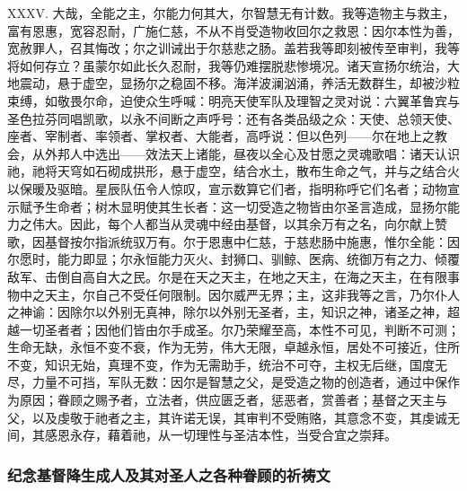 XXXV. 大哉，全能之主，尔能力何其大，尔智慧无有计数。我等造物主与救主，富有恩惠，宽容忍耐，广施仁慈，不从不肖受造物收回尔之救恩：因尔本性为善，宽赦罪人，召其悔改；尔之训诫出于尔慈悲之肠。盖若我等即刻被传至审判，我等将如何存立？虽蒙尔如此长久忍耐，我等仍难摆脱悲惨境况。诸天宣扬尔统治，大地震动，悬于虚空，显扬尔之稳固不移。海洋波澜汹涌，养活无数群生，却被沙粒束缚，如敬畏尔命，迫使众生呼喊：明亮天使军队及理智之灵对说：六翼革鲁宾与圣色拉芬同唱凯歌，以永不间断之声呼号：还有各类品级之众：天使、总领天使、座者、宰制者、率领者、掌权者、大能者，高呼说：但以色列——尔在地上之教会，从外邦人中选出——效法天上诸能，昼夜以全心及甘愿之灵魂歌唱：诸天认识祂，祂将天穹如石砌成拱形，悬于虚空，结合水土，散布生命之气，并与之结合火以保暖及驱暗。星辰队伍令人惊叹，宣示数算它们者，指明称呼它们名者；动物宣示赋予生命者；树木显明使其生长者：这一切受造之物皆由尔圣言造成，显扬尔能力之伟大。因此，每个人都当从灵魂中经由基督，以其余万有之名，向尔献上赞歌，因基督按尔指派统驭万有。尔于恩惠中仁慈，于慈悲肠中施惠，惟尔全能：因尔愿时，能力即显；尔永恒能力灭火、封狮口、驯鲸、医病、统御万有之力、倾覆敌军、击倒自高自大之民。尔是在天之天主，在地之天主，在海之天主，在有限事物中之天主，尔自己不受任何限制。因尔威严无界；主，这非我等之言，乃尔仆人之神谕：因除尔以外别无真神，除尔以外别无圣者，主，知识之神，诸圣之神，超越一切圣者者；因他们皆由尔手成圣。尔乃荣耀至高，本性不可见，判断不可测；生命无缺，永恒不变不衰，作为无劳，伟大无限，卓越永恒，居处不可接近，住所不变，知识无始，真理不变，作为无需助手，统治不可夺，主权无后继，国度无尽，力量不可挡，军队无数：因尔是智慧之父，是受造之物的创造者，通过中保作为原因；眷顾之赐予者，立法者，供应匮乏者，惩恶者，赏善者；基督之天主与父，以及虔敬于祂者之主，其许诺无误，其审判不受贿赂，其意念不变，其虔诚无间，其感恩永存，藉着祂，从一切理性与圣洁本性，当受合宜之崇拜。\par


\subsubsection{纪念基督降生成人及其对圣人之各种眷顾的祈祷文}

